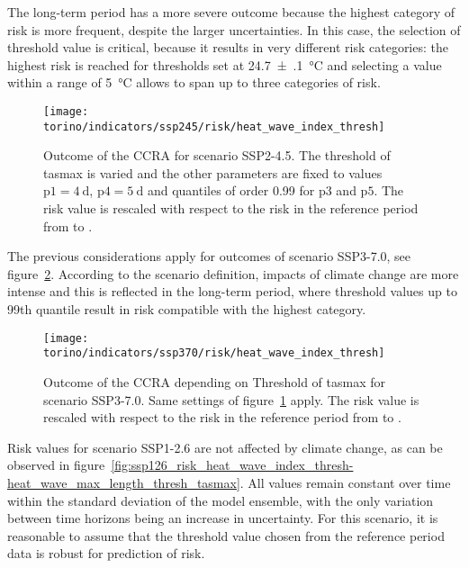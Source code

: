 The long-term period has a more severe outcome because the highest category of risk is more frequent, despite the larger uncertainties. In this case, the selection of threshold value is critical, because it results in very different risk categories: the highest risk is reached for thresholds set at \qty{24.7(1)}{\degreeCelsius} and selecting a value within a range of \qty{5}{\degreeCelsius} allows to span up to three categories of risk.

\begin{figure}
  \centering
  \texttt{[image: torino/indicators/ssp245/risk/heat\_wave\_index\_thresh]}
  \caption{Outcome of the \gls{CCRA} for scenario SSP2-4.5. The threshold of \gls{tasmax} is varied and the other parameters are fixed to values $\mathrm{p1} = \qty{4}{\day}$, $\mathrm{p4} = \qty{5}{\day}$ and quantiles of order 0.99 for $\mathrm{p3}$ and $\mathrm{p5}$. The risk value is rescaled with respect to the risk in the reference period from  to .}
  \label{fig:ssp245_risk_heat_wave_index_thresh-heat_wave_max_length_thresh_tasmax}
\end{figure}

The previous considerations apply for outcomes of scenario SSP3-7.0, see figure~\ref{fig:ssp370_risk_heat_wave_index_thresh-heat_wave_max_length_thresh_tasmax}. According to the scenario definition, impacts of climate change are more intense and this is reflected in the long-term period, where threshold values up to 99th quantile result in risk compatible with the highest category.

\begin{figure}
  \centering
  \texttt{[image: torino/indicators/ssp370/risk/heat\_wave\_index\_thresh]}
  \caption{Outcome of the \gls{CCRA} depending on {Threshold of \gls{tasmax}} for scenario SSP3-7.0. Same settings of figure~\ref{fig:ssp245_risk_heat_wave_index_thresh-heat_wave_max_length_thresh_tasmax} apply. The risk value is rescaled with respect to the risk in the reference period from  to .}
  \label{fig:ssp370_risk_heat_wave_index_thresh-heat_wave_max_length_thresh_tasmax}
\end{figure}

Risk values for scenario SSP1-2.6 are not affected by climate change, as can be observed in figure~\ref{fig:ssp126_risk_heat_wave_index_thresh-heat_wave_max_length_thresh_tasmax}. All values remain constant over time within the standard deviation of the model ensemble, with the only variation between time horizons being an increase in uncertainty. For this scenario, it is reasonable to assume that the threshold value chosen from the reference period data is robust for prediction of risk.


